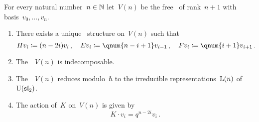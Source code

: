 \documentclass[a4paper, 11pt, oneside]{scrartcl}
\begin{document}
\begin{theorem}
  For every natural number~$n \in \mathbb{N}$ let~$V(n)$ be the free~\module{$\kfhbar$} of rank~$n+1$ with basis~$v_0, \dotsc, v_n$.
  \begin{enumerate}
    \item
      There exists a unique~ structure on~$V(n)$ such that
      \[
        H v_i \defined (n - 2i) v_i \,,
        \quad
        E v_i \defined \qnum{n - i + 1} v_{i-1} \,,
        \quad
        F v_i \defined \qnum{i+1} v_{i+1} \,.
      \]
    \item
      The~~$V(n)$ is indecomposable.
    \item
      The~~$V(n)$ reduces modulo~$\hbar$ to the irreducible representations~$\operatorname{L}(n)$ of~$\operatorname{U}(\mathfrak{sl}_2)$.
    \item
      The action of~$K$ on~$V(n)$ is given by
      \[
        K \cdot v_i = q^{n - 2i} v_i \,.
      \]
  \end{enumerate}
\end{theorem}






\printbibliography
\end{document}
